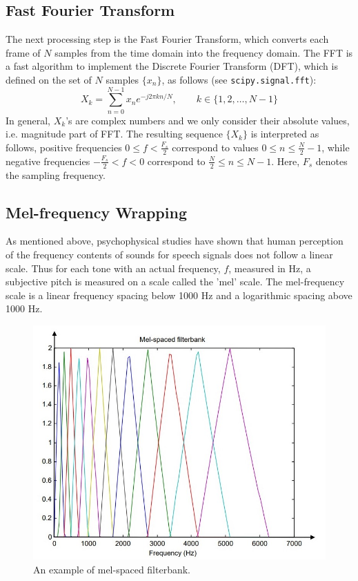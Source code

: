 \documentclass{article}
\begin{document}
\subsection{Fast Fourier Transform}
The next processing step is the Fast Fourier Transform, which converts each frame of $N$ samples from the time domain into the frequency domain.  The FFT is a fast algorithm to implement the Discrete Fourier Transform (DFT), which is defined on the set of $N$ samples $\{x_n\}$, as follows (see \texttt{scipy.signal.fft}):
\begin{equation}
    X_k = \sum_{n=0}^{N-1} x_n e^{-j2\pi k n/N}, \qquad k\in\{1,2,\dots, N-1\}
\end{equation}
In general, $X_k$'s are complex numbers and we only consider their absolute values, i.e. magnitude part of FFT. The resulting sequence $\{X_k\}$ is interpreted as follows, positive frequencies $0\leq f < \frac{F_s}{2}$ correspond to values $0\leq n \leq \frac{N}{2}-1$, while negative frequencies $-\frac{F_s}{2}< f < 0$ correspond to $\frac{N}{2} \leq n \leq N-1$.  Here, $F_s$ denotes the sampling frequency.

\subsection{Mel-frequency Wrapping}
As mentioned above, psychophysical studies have shown that human perception of the frequency contents of sounds for speech signals does not follow a linear scale. Thus for each tone with an actual frequency, $f$, measured in Hz, a subjective pitch is measured on a scale called the 'mel' scale.  The mel-frequency scale is a linear frequency spacing below 1000 Hz and a logarithmic spacing above 1000 Hz.  

\begin{figure}
    \centering
    \includegraphics[width=.8\textwidth]{Fig2.jpg}
    \caption{An example of mel-spaced filterbank.}
\end{figure}
\end{document}
